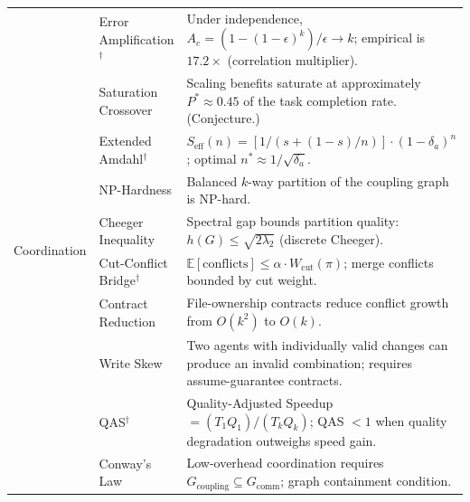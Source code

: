 \begin{appendices}
\begin{table}[H]
\begin{tabular}{p{1.8cm}p{3.8cm}p{7.5cm}}
\midrule

\multirow{10}{1.8cm}{Coordination}
    & Error Amplification$^\dagger$ & Under independence, $A_e = (1-(1-\epsilon)^k)/\epsilon \to k$; empirical is $17.2\times$ (correlation multiplier). \\
    & Saturation Crossover & Scaling benefits saturate at approximately $P^* \approx 0.45$ of the task completion rate. (Conjecture.) \\
    & Extended Amdahl$^\dagger$ & $S_{\text{eff}}(n) = [1/(s+(1-s)/n)] \cdot (1-\delta_a)^n$; optimal $n^* \approx 1/\sqrt{\delta_a}$. \\
    & NP-Hardness & Balanced $k$-way partition of the coupling graph is NP-hard. \\
    & Cheeger Inequality & Spectral gap bounds partition quality: $h(G) \leq \sqrt{2\lambda_2}$ (discrete Cheeger). \\
    & Cut-Conflict Bridge$^\dagger$ & $\mathbb{E}[\text{conflicts}] \leq \alpha \cdot W_{\text{cut}}(\pi)$; merge conflicts bounded by cut weight. \\
    & Contract Reduction & File-ownership contracts reduce conflict growth from $O(k^2)$ to $O(k)$. \\
    & Write Skew & Two agents with individually valid changes can produce an invalid combination; requires assume-guarantee contracts. \\
    & QAS$^\dagger$ & Quality-Adjusted Speedup $= (T_1 Q_1)/(T_k Q_k)$; QAS $< 1$ when quality degradation outweighs speed gain. \\
    & Conway's Law & Low-overhead coordination requires $G_{\text{coupling}} \subseteq G_{\text{comm}}$; graph containment condition. \\

\midrule


\end{tabular}
\end{table}
\end{appendices}
